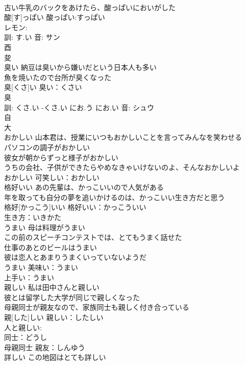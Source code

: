 \documentclass[8pt]{extreport}
\begin{document}
\begin{CJK}{UTF8}{min}
\\	古い牛乳のバックをあけたら、酸っぱいにおいがした 
\\	酸[す]っぱい			酸っぱい:すっぱい
\\	レモン:
\\	訓: す.い 音: サン 
\\	酉 
\\	夋	
\\	臭い	納豆は臭いから嫌いだという日本人も多い 
\\	魚を焼いたので台所が臭くなった 
\\	臭[くさ]い			臭い：くさい
\\	臭 
\\	訓: くさ.い -くさ.い にお.う にお.い 音: シュウ 
\\	自 
\\	大 
\\	おかしい	山本君は、授業にいつもおかしいことを言ってみんなを笑わせる 
\\	パソコンの調子がおかしい 
\\	彼女が朝からずっと様子がおかしい 
\\	うちの会社、子供ができたらやめなきゃいけないのよ、そんなおかしいよ 
\\	おかしい			可笑しい：おかしい
\\	格好いい	あの先輩は、かっこいいので人気がある 
\\	年を取っても自分の夢を追いかけるのは、かっこいい生き方だと思う 
\\	格好[かっこう]いい			格好いい：かっこういい
\\	生き方：いきかた
\\	うまい	母は料理がうまい 
\\	この前のスピーチコンテストでは、とてもうまく話せた 
\\	仕事のあとのビールはうまい 
\\	彼は恋人とあまりうまくいっていないようだ 
\\	うまい			美味い：うまい
\\	上手い：うまい
\\	親しい	私は田中さんと親しい 
\\	彼とは留学した大学が同じで親しくなった 
\\	母親同士が親友なので、家族同士も親しく付き合っている 
\\	親[した]しい			親しい：したしい
\\	人と親しい:
\\	同士：どうし
\\	母親同士 親友：しんゆう
\\	詳しい	この地図はとても詳しい 

\end{CJK}
\end{document}

